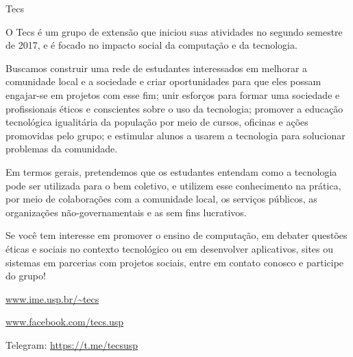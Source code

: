 
\begin{subsecao}{Tecs}


O Tecs é um grupo de extensão que iniciou suas atividades no segundo semestre de
2017, e é focado no impacto social da computação e da tecnologia. 

Buscamos construir uma rede de estudantes interessados em melhorar a comunidade
local e a sociedade e criar oportunidades para que eles possam engajar-se em
projetos com esse fim; unir esforços para formar uma sociedade e profissionais
éticos e conscientes sobre o uso da tecnologia; promover a educação tecnológica
igualitária da população por meio de cursos, oficinas e ações promovidas pelo
grupo; e estimular alunos a usarem a tecnologia para solucionar problemas da
comunidade. 

Em termos gerais, pretendemos que os estudantes entendam como a tecnologia pode
ser utilizada para o bem coletivo, e utilizem esse conhecimento na prática, por
meio de colaborações com a comunidade local, os serviços públicos, as
organizações não-governamentais e as sem fins lucrativos. 

Se você tem interesse em promover o ensino de computação, em debater questões
éticas e sociais no contexto tecnológico ou em desenvolver aplicativos, sites ou
sistemas em parcerias com projetos sociais, entre em contato conosco e participe
do grupo!

\begin{center}
  \Large
  \url{www.ime.usp.br/~tecs}

  \url{www.facebook.com/tecs.usp}

  Telegram: \url{https://t.me/tecsusp}
\end{center}

\end{subsecao}
